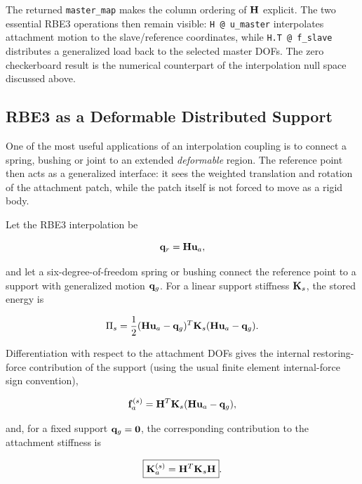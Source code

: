 The returned \texttt{master\_map} makes the column ordering of $\mathbf{H}$
explicit. The two essential RBE3 operations then remain visible:
\texttt{H @ u\_master} interpolates attachment motion to the slave/reference
coordinates, while \texttt{H.T @ f\_slave} distributes a generalized load back
to the selected master DOFs. The zero checkerboard result is the numerical
counterpart of the interpolation null space discussed above.

\subsection{RBE3 as a Deformable Distributed Support}\label{sec:rbe3-deformable-support}

One of the most useful applications of an interpolation coupling is to connect a
spring, bushing or joint to an extended \emph{deformable} region. The reference
point then acts as a generalized interface: it sees the weighted translation and
rotation of the attachment patch, while the patch itself is not forced to move as
a rigid body.

Let the RBE3 interpolation be

\begin{equation}\label{rbe3-support-interpolation}
    \mathbf{q}_r=\mathbf{H}\mathbf{u}_a,
\end{equation}

and let a six-degree-of-freedom spring or bushing connect the reference point to
a support with generalized motion $\mathbf{q}_g$. For a linear support stiffness
$\mathbf{K}_s$, the stored energy is

\begin{equation}\label{rbe3-support-energy}
    \Pi_s=\frac{1}{2}
    (\mathbf{H}\mathbf{u}_a-\mathbf{q}_g)^T
    \mathbf{K}_s
    (\mathbf{H}\mathbf{u}_a-\mathbf{q}_g).
\end{equation}

Differentiation with respect to the attachment DOFs gives the internal
restoring-force contribution of the support (using the usual finite element
internal-force sign convention),

\begin{equation}\label{rbe3-support-force}
    \mathbf{f}_a^{(s)}
    =\mathbf{H}^T\mathbf{K}_s
    (\mathbf{H}\mathbf{u}_a-\mathbf{q}_g),
\end{equation}

and, for a fixed support $\mathbf{q}_g=\mathbf{0}$, the corresponding contribution to the
attachment stiffness is

\begin{equation}\label{rbe3-distributed-support-stiffness}
    \boxed{\mathbf{K}_a^{(s)}=\mathbf{H}^T\mathbf{K}_s\mathbf{H}}.
\end{equation}

